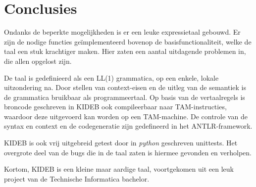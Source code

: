 \chapter{Conclusies} %
\label{cha:conclusies}
Ondanks de beperkte mogelijkheden is er een leuke expressietaal gebouwd. Er zijn de nodige functies ge\"implementeerd bovenop de basisfunctionaliteit, welke de taal een stuk krachtiger maken. Hier zaten een aantal uitdagende problemen in, die allen opgelost zijn.

De taal is gedefinieerd als een LL(1) grammatica, op een enkele, lokale uitzondering na. Door stellen van context-eisen en de uitleg van de semantiek is de grammatica bruikbaar als programmeertaal. Op basis van de vertaalregels is broncode geschreven in KIDEB ook compileerbaar naar TAM-instructies, waardoor deze uitgevoerd kan worden op een TAM-machine. De controle van de syntax en context en de codegeneratie zijn gedefineerd in het ANTLR-framework.

KIDEB is ook vrij uitgebreid getest door in \emph{python} geschreven unittests. Het overgrote deel van de bugs die in de taal zaten is hiermee gevonden en verholpen. 

Kortom, KIDEB is een kleine maar aardige taal, voortgekomen uit een leuk project van de Technische Informatica bachelor.

\clearpage